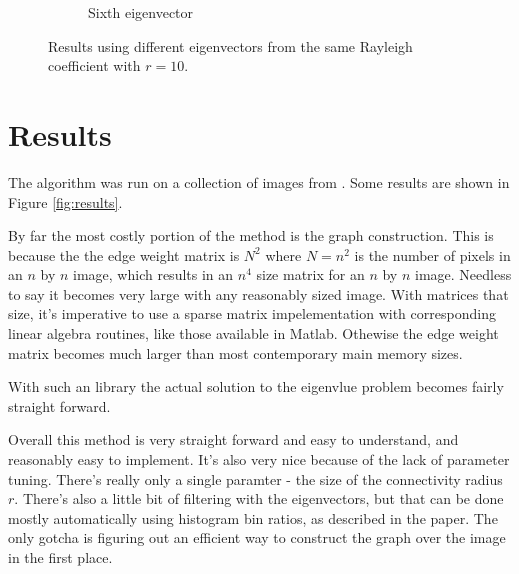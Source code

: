 \documentclass[11pt]{article}
\begin{document}
\begin{figure}
\begin{subfigure}[b]{0.4\textwidth}
\caption{Sixth eigenvector}
\label{fig:ev6:r10}
\end{subfigure}
\caption{Results using different eigenvectors from the same Rayleigh coefficient with $r=10$.}
\label{fig:ev:r10}
\end{figure}

\section{Results}

The algorithm was run on a collection of images from \cite{berkeleyImages}.
Some results are shown in Figure \ref{fig:results}.

By far the most costly portion of the method is the graph construction.
This is because the the edge weight matrix is $N^2$ where $N=n^2$ is the number of pixels in an $n$ by $n$ image, which results in an $n^4$ size matrix for an $n$ by $n$ image.
Needless to say it becomes very large with any reasonably sized image.
With matrices that size, it's imperative to use a sparse matrix impelementation with corresponding linear algebra routines, like those available in Matlab.
Othewise the edge weight matrix becomes much larger than most contemporary main memory sizes.

With such an library the actual solution to the eigenvlue problem becomes fairly straight forward.

Overall this method is very straight forward and easy to understand, and reasonably easy to implement.
It's also very nice because of the lack of parameter tuning.  There's really only a single paramter - the size of the connectivity radius $r$.
There's also a little bit of filtering with the eigenvectors, but that can be done mostly automatically using histogram bin ratios, as described in the paper.
The only gotcha is figuring out an efficient way to construct the graph over the image in the first place.
\end{document}
